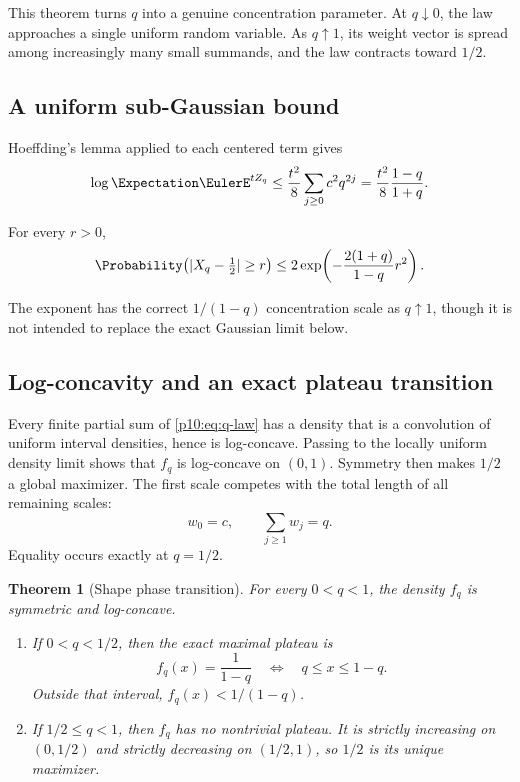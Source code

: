 \documentclass[11pt]{article}
\numberwithin{equation}{section}
\newtheorem{theorem}{Theorem}[section]
\theoremstyle{definition}
\theoremstyle{remark}
\begin{document}
This theorem turns $q$ into a genuine concentration parameter.  At $q\downarrow0$, the law
approaches a single uniform random variable.  As $q\uparrow1$, its weight vector is spread
among increasingly many small summands, and the law contracts toward $1/2$.

\subsection{A uniform sub-Gaussian bound}

Hoeffding's lemma applied to each centered term gives
\[
 \log\Expectation\EulerE^{tZ_q}
 \le\frac{t^2}{8}\sum_{j\ge0}c^2q^{2j}
 =\frac{t^2}{8}\frac{1-q}{1+q}.
\]

\begin{corollary}[Concentration]
\label{p10:cor:concentration}
For every $r>0$,
\begin{equation}
 \Probability\bigl(|X_q-\tfrac12|\ge r\bigr)
 \le2\exp\!\left(-\frac{2(1+q)}{1-q}r^2\right).             \label{p10:eq:hoeffding}
\end{equation}
\end{corollary}

The exponent has the correct $1/(1-q)$ concentration scale as $q\uparrow1$, though it is not
intended to replace the exact Gaussian limit below.

\subsection{Log-concavity and an exact plateau transition}

Every finite partial sum of \eqref{p10:eq:q-law} has a density that is a convolution of uniform
interval densities, hence is log-concave.  Passing to the locally uniform density limit shows
that $f_q$ is log-concave on $(0,1)$.  Symmetry then makes $1/2$ a global maximizer.
The first scale competes with the total length of all remaining scales:
\[
 w_0=c,
 \qquad
 \sum_{j\ge1}w_j=q.
\]
Equality occurs exactly at $q=1/2$.

\begin{theorem}[Shape phase transition]
\label{p10:thm:plateau}
For every $0<q<1$, the density $f_q$ is symmetric and log-concave.

\begin{enumerate}[label=\textup{(\roman*)}]
\item If $0<q<1/2$, then the exact maximal plateau is
\begin{equation}
 f_q(x)=\frac{1}{1-q}
 \quad\Longleftrightarrow\quad q\le x\le1-q.                 \label{p10:eq:plateau}
\end{equation}
Outside that interval, $f_q(x)<1/(1-q)$.
\item If $1/2\le q<1$, then $f_q$ has no nontrivial plateau.  It is strictly increasing on
$(0,1/2)$ and strictly decreasing on $(1/2,1)$, so $1/2$ is its unique maximizer.
\end{enumerate}
\end{theorem}
\end{document}
